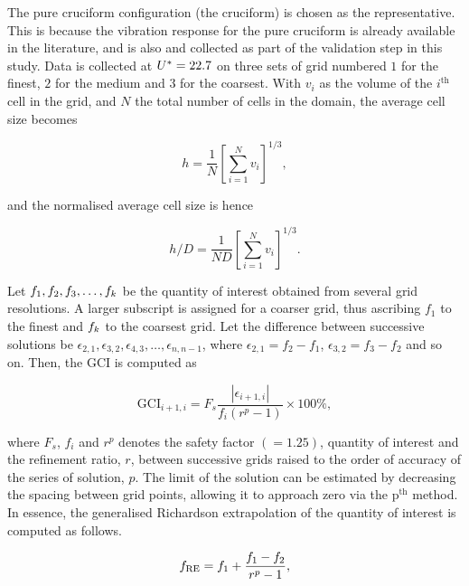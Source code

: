 \documentclass[oneside]{utmthesis}
\begin{document}
The pure cruciform configuration (the \angfi{} cruciform) is chosen as the representative. This is because the vibration response for the pure cruciform is already available in the literature, and is also and collected as part of the validation step in this study. Data is collected at $U^{*} = 22.7$ on three sets of grid numbered $1$ for the finest, $2$ for the medium and $3$ for the coarsest. With $v_{i}$ as the volume of the $i^{\text{th}}$ cell in the grid, and $N$ the total number of cells in the domain, the average cell size becomes

\begin{equation}
  h = \frac{1}{N} \left [ \sum_{i=1}^{N} v_{i} \right ]^{1/3},
  \label{eq:averageCellSize}
\end{equation}

\noindent and the normalised average cell size is hence

\begin{equation}
  h/D = \frac{1}{ND} \left [ \sum_{i=1}^{N} v_{i} \right ]^{1/3}.
  \label{eq:normAveCellSize}
\end{equation}

Let $f_{1},f_{2},f_{3},\dots,f_{k}$ be the quantity of interest obtained from several grid resolutions. A larger subscript is assigned for a coarser grid, thus ascribing $f_{1}$ to the finest and $f_{k}$ to the coarsest grid. Let the difference between successive solutions be $\epsilon_{2,1},\epsilon_{3,2},\epsilon_{4,3},\dots,\epsilon_{n,n-1}$, where $\epsilon_{2,1} = f_{2} - f_{1}$, $\epsilon_{3,2} = f_{3} - f_{2}$ and so on. Then, the GCI is computed as

\begin{equation}
  \text{GCI}_{i+1,i} = F_{s} \frac{\left |\epsilon_{i+1,i} \right |}{f_{i} \left ( r^{p} - 1 \right )} \times 100\%,
  \label{eq:gci}
\end{equation}

\noindent where $F_{s}$, $f_{i}$ and $r^{p}$ denotes the safety factor $\left ( = 1.25 \right )$, quantity of interest and the refinement ratio, $r$, between successive grids raised to the order of accuracy of the series of solution, $p$. The limit of the solution can be estimated by decreasing the spacing between grid points, allowing it to approach zero via the $\text{p}^{\text{th}}$ method. In essence, the generalised Richardson extrapolation of the quantity of interest is computed as follows.

\begin{equation}
  f_{\text{RE}} = f_{1} + \frac{f_{1} - f_{2}}{r^{p} - 1},
  \label{eq:richardsonExtrapolation}
\end{equation}
\end{document}
